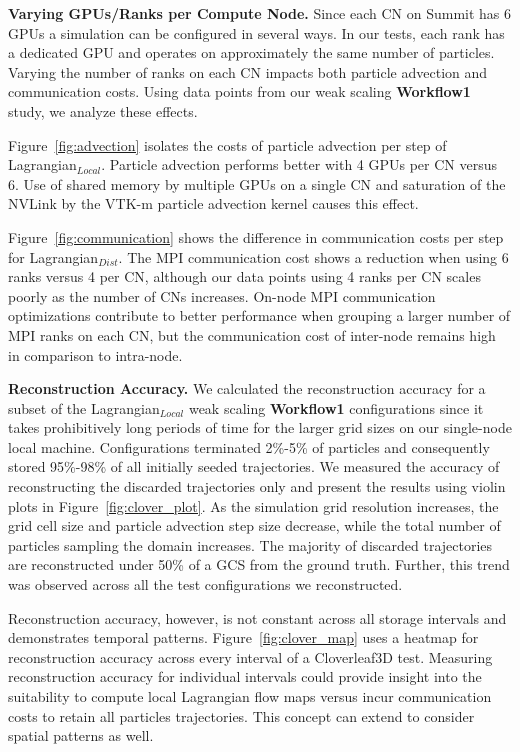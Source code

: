 \textbf{Varying GPUs/Ranks per Compute Node.}
Since each CN on Summit has 6 GPUs a simulation can be configured in several ways.
%
In our tests, each rank has a dedicated GPU and operates on approximately the same number of particles.
%
Varying the number of ranks on each CN impacts both particle advection and communication costs.
%
Using data points from our weak scaling \textbf{Workflow1} study, we analyze these effects.
%

Figure~\ref{fig:advection} isolates the costs of particle advection per step of Lagrangian$_{Local}$.
%
Particle advection performs better with 4 GPUs per CN versus 6.
%
Use of shared memory by multiple GPUs on a single CN and saturation of the NVLink by the VTK-m particle advection kernel causes this effect.
%

Figure~\ref{fig:communication} shows the difference in communication costs per step for Lagrangian$_{Dist}$.
%
The MPI communication cost shows a reduction when using 6 ranks versus 4 per CN, although our data points using 4 ranks per CN scales poorly as the number of CNs increases.
%
On-node MPI communication optimizations contribute to better performance when grouping a larger number of MPI ranks on each CN, but the communication cost of inter-node remains high in comparison to intra-node.

%
%

\textbf{Reconstruction Accuracy.}
We calculated the reconstruction accuracy for a subset of the Lagrangian$_{Local}$ weak scaling \textbf{Workflow1} configurations since it takes prohibitively long periods of time for the larger grid sizes on our single-node local machine.
%
Configurations terminated 2\%-5\% of particles and consequently stored 95\%-98\% of all initially seeded trajectories. 
%
We measured the accuracy of reconstructing the discarded trajectories only and present the results using violin plots in Figure~\ref{fig:clover_plot}.
%
As the simulation grid resolution increases, the grid cell size and particle advection step size decrease, while the total number of particles sampling the domain increases. 
%
The majority of discarded trajectories are reconstructed under 50\% of a GCS from the ground truth.
%
Further, this trend was observed across all the test configurations we reconstructed. 

Reconstruction accuracy, however, is not constant across all storage intervals and demonstrates temporal patterns.
%
%
Figure~\ref{fig:clover_map} uses a heatmap for reconstruction accuracy across every interval of a Cloverleaf3D test. 
%
Measuring reconstruction accuracy for individual intervals could provide insight into the suitability to compute local Lagrangian flow maps versus incur communication costs to retain all particles trajectories.
%
This concept can extend to consider spatial patterns as well. 

